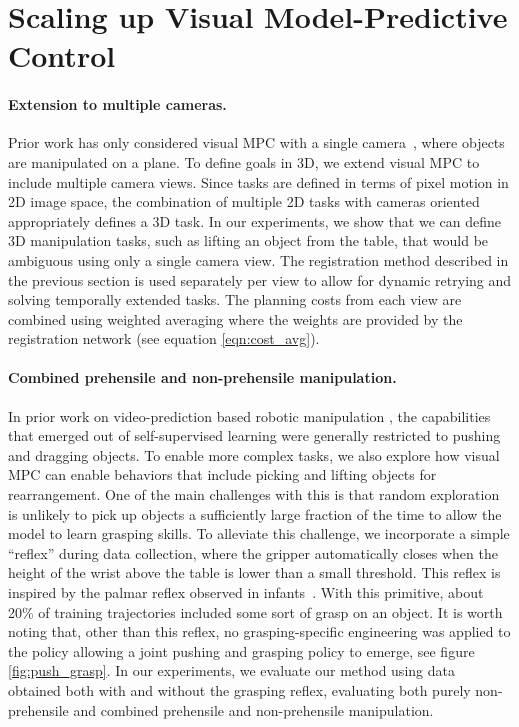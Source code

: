 \section{Scaling up Visual Model-Predictive Control}
\label{sec:scalingup}
\paragraph{Extension to multiple cameras.}
Prior work has only considered visual MPC with a single camera~\cite{foresight,sna}, where objects are manipulated on a plane. To define goals in 3D, we extend visual MPC to include multiple camera views. Since tasks are defined in terms of pixel motion in 2D image space, the combination of multiple 2D tasks with cameras oriented appropriately defines a 3D task. In our experiments, we show that we can define 3D manipulation tasks, such as lifting an object from the table, that would be ambiguous using only a single camera view. The registration method described in the previous section is used separately per view to allow for dynamic retrying and solving temporally extended tasks. The planning costs from each view are combined using weighted averaging where the weights are provided by the registration network (see equation \ref{eqn:cost_avg}). 

\vspace{-0.1in}
\paragraph{Combined prehensile and non-prehensile manipulation.}
In prior work on video-prediction based robotic manipulation \cite{sna, foresight}, the capabilities that emerged out of self-supervised learning were generally restricted to pushing and dragging objects. To enable more complex tasks, we also explore how visual MPC can enable behaviors that include picking and lifting objects for rearrangement. One of the main challenges with this is that random exploration is unlikely to pick up objects a sufficiently large fraction of the time to allow the model to learn grasping skills. To alleviate this challenge, we incorporate a simple ``reflex'' during data collection, where the gripper automatically closes when the height of the wrist above the table is lower than a small threshold. This reflex is inspired by the palmar reflex observed in infants~\cite{grasping_fetal}. With this primitive, about 20\% of training trajectories included some sort of grasp on an object. It is worth noting that, other than this reflex, no grasping-specific engineering was applied to the policy allowing a joint pushing and grasping policy to emerge, see figure \ref{fig:push_grasp}. In our experiments, we evaluate our method using data obtained both with and without the grasping reflex, evaluating both purely non-prehensile and combined prehensile and non-prehensile manipulation.

